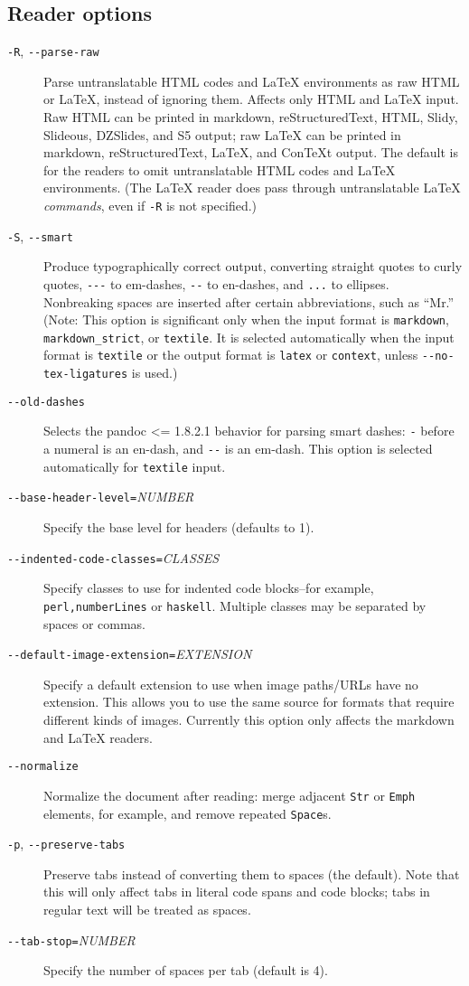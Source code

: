\documentclass[]{article}
\begin{document}
\subsection{Reader options}

\begin{description}
\item[\texttt{-R}, \texttt{-{}-parse-raw}]
Parse untranslatable HTML codes and LaTeX environments as raw HTML or
LaTeX, instead of ignoring them. Affects only HTML and LaTeX input. Raw
HTML can be printed in markdown, reStructuredText, HTML, Slidy,
Slideous, DZSlides, and S5 output; raw LaTeX can be printed in markdown,
reStructuredText, LaTeX, and ConTeXt output. The default is for the
readers to omit untranslatable HTML codes and LaTeX environments. (The
LaTeX reader does pass through untranslatable LaTeX \emph{commands},
even if \texttt{-R} is not specified.)
\item[\texttt{-S}, \texttt{-{}-smart}]
Produce typographically correct output, converting straight quotes to
curly quotes, \texttt{-{}-{}-} to em-dashes, \texttt{-{}-} to en-dashes,
and \texttt{...} to ellipses. Nonbreaking spaces are inserted after
certain abbreviations, such as ``Mr.'' (Note: This option is significant
only when the input format is \texttt{markdown},
\texttt{markdown\_strict}, or \texttt{textile}. It is selected
automatically when the input format is \texttt{textile} or the output
format is \texttt{latex} or \texttt{context}, unless
\texttt{-{}-no-tex-ligatures} is used.)
\item[\texttt{-{}-old-dashes}]
Selects the pandoc \textless{}= 1.8.2.1 behavior for parsing smart
dashes: \texttt{-} before a numeral is an en-dash, and \texttt{-{}-} is
an em-dash. This option is selected automatically for \texttt{textile}
input.
\item[\texttt{-{}-base-header-level=}\emph{NUMBER}]
Specify the base level for headers (defaults to 1).
\item[\texttt{-{}-indented-code-classes=}\emph{CLASSES}]
Specify classes to use for indented code blocks--for example,
\texttt{perl,numberLines} or \texttt{haskell}. Multiple classes may be
separated by spaces or commas.
\item[\texttt{-{}-default-image-extension=}\emph{EXTENSION}]
Specify a default extension to use when image paths/URLs have no
extension. This allows you to use the same source for formats that
require different kinds of images. Currently this option only affects
the markdown and LaTeX readers.
\item[\texttt{-{}-normalize}]
Normalize the document after reading: merge adjacent \texttt{Str} or
\texttt{Emph} elements, for example, and remove repeated
\texttt{Space}s.
\item[\texttt{-p}, \texttt{-{}-preserve-tabs}]
Preserve tabs instead of converting them to spaces (the default). Note
that this will only affect tabs in literal code spans and code blocks;
tabs in regular text will be treated as spaces.
\item[\texttt{-{}-tab-stop=}\emph{NUMBER}]
Specify the number of spaces per tab (default is 4).
\end{description}
\end{document}
